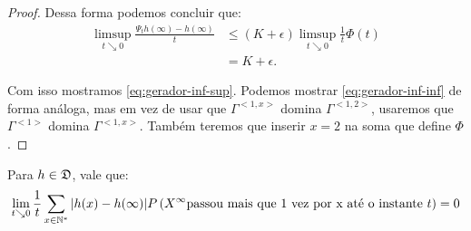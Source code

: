 \begin{proof}
  Dessa forma podemos concluir que:
  \begin{align*}
    \limsup_{t \searrow 0} \frac{\Psi_t h(\infty) - h(\infty)}{t}
    &\leq \left( K + \epsilon \right) \limsup_{t \searrow
      0}\frac{1}{t}  \Phi(t)\\
    &= K + \epsilon.
  \end{align*}


  Com isso mostramos \eqref{eq:gerador-inf-sup}. Podemos mostrar
  \eqref{eq:gerador-inf-inf} de forma análoga, mas em vez de usar que
  $\Gamma^{<1,x>}$ domina $\Gamma^{<1,2>}$, usaremos que
  $\Gamma^{<1>}$ domina $\Gamma^{<1, x>}$. Também teremos que inserir
  $x = 2$ na soma que define $\Phi$.
\end{proof}

\begin{lema}
  \label{lema:gerador-erro}
  Para $h \in {\mathfrak{D}}$, vale que:
  \begin{equation}
    \label{eq:gerador-erro}
    \lim_{t \searrow 0} \frac{1}{t} \sum_{x\in{\mathbb{N^*}}} |h(x) - h(\infty)|
    P\left( X^\infty \text{passou mais que 1 vez por x até o
      instante } t \right) = 0
  \end{equation}
\end{lema}
